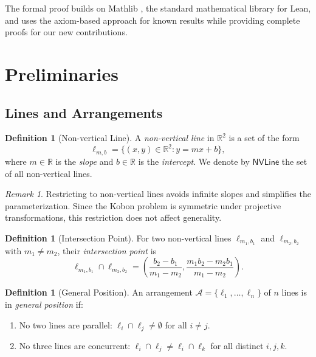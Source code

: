\documentclass[11pt,a4paper]{article}
\theoremstyle{plain}
\theoremstyle{definition}
\newtheorem{definition}[theorem]{Definition}
\theoremstyle{remark}
\newtheorem{remark}[theorem]{Remark}
\newcommand{\R}{\mathbb{R}}
\begin{document}
The formal proof builds on Mathlib \cite{mathlib2024}, the standard mathematical library for Lean, and uses the axiom-based approach for known results while providing complete proofs for our new contributions.

\section{Preliminaries}

\subsection{Lines and Arrangements}

\begin{definition}[Non-vertical Line]
A \emph{non-vertical line} in $\R^2$ is a set of the form
\[
\ell_{m,b} = \{(x,y) \in \R^2 : y = mx + b\},
\]
where $m \in \R$ is the \emph{slope} and $b \in \R$ is the \emph{intercept}. We denote by $\mathsf{NVLine}$ the set of all non-vertical lines.
\end{definition}

\begin{remark}
Restricting to non-vertical lines avoids infinite slopes and simplifies the parameterization. Since the Kobon problem is symmetric under projective transformations, this restriction does not affect generality.
\end{remark}

\begin{definition}[Intersection Point]
For two non-vertical lines $\ell_{m_1,b_1}$ and $\ell_{m_2,b_2}$ with $m_1 \neq m_2$, their \emph{intersection point} is
\[
\ell_{m_1,b_1} \cap \ell_{m_2,b_2} = \left( \frac{b_2 - b_1}{m_1 - m_2}, \frac{m_1 b_2 - m_2 b_1}{m_1 - m_2} \right).
\]
\end{definition}

\begin{definition}[General Position]
An arrangement $\mathcal{A} = \{\ell_1, \ldots, \ell_n\}$ of $n$ lines is in \emph{general position} if:
\begin{enumerate}[label=(\roman*)]
\item No two lines are parallel: $\ell_i \cap \ell_j \neq \emptyset$ for all $i \neq j$.
\item No three lines are concurrent: $\ell_i \cap \ell_j \neq \ell_i \cap \ell_k$ for all distinct $i,j,k$.
\end{enumerate}
\end{definition}
\end{document}
